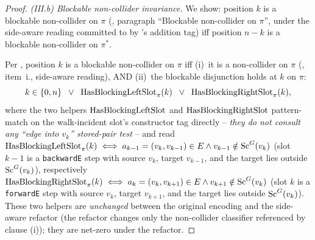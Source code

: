 \documentclass[main]{subfiles}
\begin{document}
\begin{proof}
\smallskip\noindent\emph{(III.b) Blockable non-collider invariance.}
We show: position $k$ is a blockable non-collider on $\pi$ (, paragraph ``Blockable non-collider on $\pi$'', under the side-aware reading committed to by 's addition tag) iff position $n - k$ is a blockable non-collider on $\pi^*$.

Per , position $k$ is a blockable non-collider on $\pi$ iff (i)~it is a non-collider on $\pi$ (, item~i., side-aware reading), AND (ii)~the blockable disjunction holds at $k$ on $\pi$:
\[
    k \in \{0, n\}
    \;\;\lor\;\;
    \mathrm{HasBlockingLeftSlot}_\pi(k)
    \;\;\lor\;\;
    \mathrm{HasBlockingRightSlot}_\pi(k),
\]
where the two helpers $\mathrm{HasBlockingLeftSlot}$ and $\mathrm{HasBlockingRightSlot}$ pattern-match on the walk-incident slot's constructor tag directly -- \emph{they do not consult any ``edge into $v_k$'' stored-pair test} -- and read $\mathrm{HasBlockingLeftSlot}_\pi(k) \iff a_{k-1} = (v_k, v_{k-1}) \in E \land v_{k-1} \notin \mathrm{Sc}^G(v_k)$ (slot $k - 1$ is a \texttt{backwardE} step with source $v_k$, target $v_{k-1}$, and the target lies outside $\mathrm{Sc}^G(v_k)$), respectively $\mathrm{HasBlockingRightSlot}_\pi(k) \iff a_k = (v_k, v_{k+1}) \in E \land v_{k+1} \notin \mathrm{Sc}^G(v_k)$ (slot $k$ is a \texttt{forwardE} step with source $v_k$, target $v_{k+1}$, and the target lies outside $\mathrm{Sc}^G(v_k)$). These two helpers are \emph{unchanged} between the original  encoding and the side-aware refactor (the refactor changes only the non-collider classifier referenced by clause (i)); they are net-zero under the refactor.


\end{proof}
\end{document}
